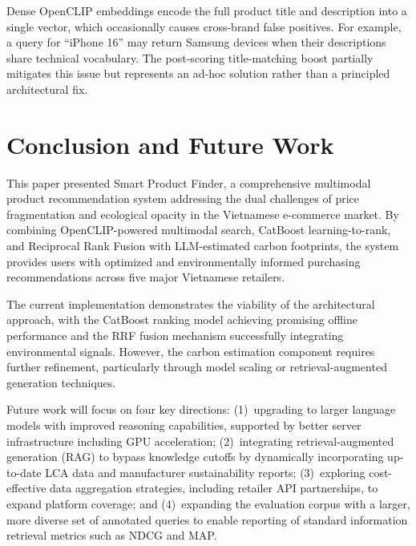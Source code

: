 \documentclass[conference]{IEEEtran}
\begin{document}
Dense OpenCLIP embeddings encode the full product title and description into a single vector, which occasionally causes cross-brand false positives. For example, a query for ``iPhone 16'' may return Samsung devices when their descriptions share technical vocabulary. The post-scoring title-matching boost partially mitigates this issue but represents an ad-hoc solution rather than a principled architectural fix.

\section{Conclusion and Future Work}

This paper presented Smart Product Finder, a comprehensive multimodal product recommendation system addressing the dual challenges of price fragmentation and ecological opacity in the Vietnamese e-commerce market. By combining OpenCLIP-powered multimodal search, CatBoost learning-to-rank, and Reciprocal Rank Fusion with LLM-estimated carbon footprints, the system provides users with optimized and environmentally informed purchasing recommendations across five major Vietnamese retailers.

The current implementation demonstrates the viability of the architectural approach, with the CatBoost ranking model achieving promising offline performance and the RRF fusion mechanism successfully integrating environmental signals. However, the carbon estimation component requires further refinement, particularly through model scaling or retrieval-augmented generation techniques.

Future work will focus on four key directions: (1)~upgrading to larger language models with improved reasoning capabilities, supported by better server infrastructure including GPU acceleration; (2)~integrating retrieval-augmented generation (RAG) to bypass knowledge cutoffs by dynamically incorporating up-to-date LCA data and manufacturer sustainability reports; (3)~exploring cost-effective data aggregation strategies, including retailer API partnerships, to expand platform coverage; and (4)~expanding the evaluation corpus with a larger, more diverse set of annotated queries to enable reporting of standard information retrieval metrics such as NDCG and MAP.
\end{document}
